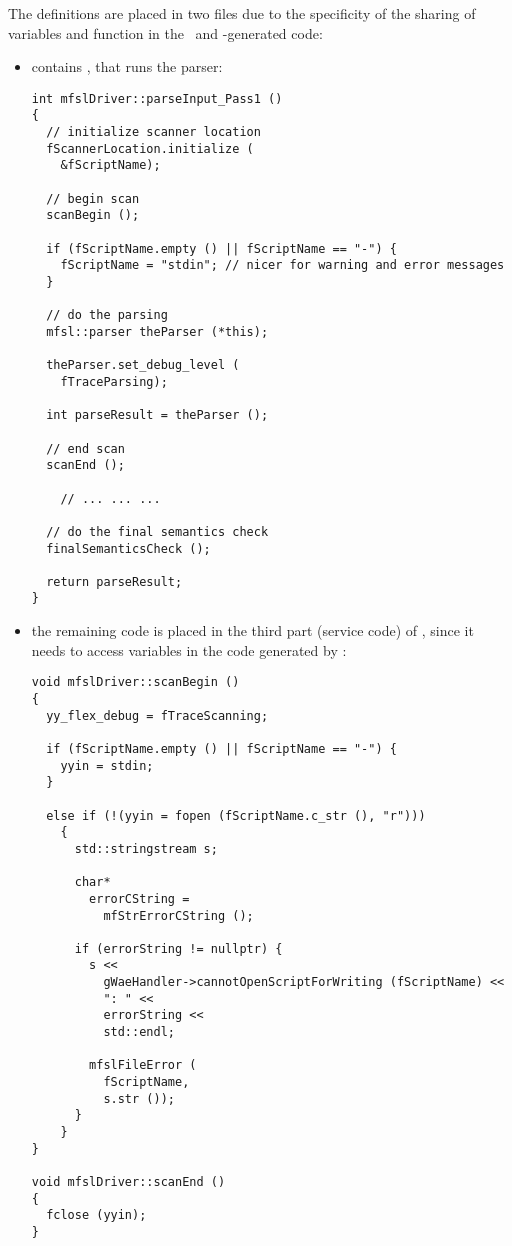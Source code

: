The definitions are placed in two files due to the specificity of the sharing of variables and function in the \flex\ and \bison-generated code: %
\begin{itemize}

\item {} contains , that runs the parser:
\begin{lstlisting}[language=CPlusPlus]
int mfslDriver::parseInput_Pass1 ()
{
  // initialize scanner location
  fScannerLocation.initialize (
    &fScriptName);

  // begin scan
  scanBegin ();

  if (fScriptName.empty () || fScriptName == "-") {
    fScriptName = "stdin"; // nicer for warning and error messages
  }

  // do the parsing
  mfsl::parser theParser (*this);

  theParser.set_debug_level (
    fTraceParsing);

  int parseResult = theParser ();

  // end scan
  scanEnd ();

	// ... ... ...

  // do the final semantics check
  finalSemanticsCheck ();

  return parseResult;
}
\end{lstlisting}

\item the remaining code is placed in the third part (service code) of , since it needs to access variables in the code generated by \flex:
\begin{lstlisting}[language=CPlusPlus]
void mfslDriver::scanBegin ()
{
  yy_flex_debug = fTraceScanning;

  if (fScriptName.empty () || fScriptName == "-") {
    yyin = stdin;
  }

  else if (!(yyin = fopen (fScriptName.c_str (), "r")))
    {
      std::stringstream s;

      char*
        errorCString =
          mfStrErrorCString ();

      if (errorString != nullptr) {
        s <<
          gWaeHandler->cannotOpenScriptForWriting (fScriptName) <<
          ": " <<
          errorString <<
          std::endl;

        mfslFileError (
          fScriptName,
          s.str ());
      }
    }
}

void mfslDriver::scanEnd ()
{
  fclose (yyin);
}
\end{lstlisting}

\end{itemize}


